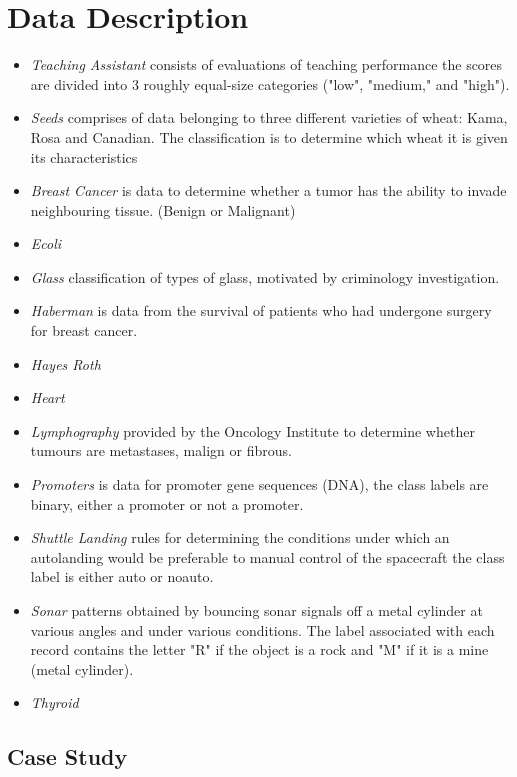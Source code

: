 \documentclass{cmppgr}
\begin{document}
 


\section{Data Description}
\begin{itemize}
	\item \textit{Teaching Assistant} consists of evaluations of teaching performance the scores are divided into 3 roughly equal-size categories ("low", "medium," and "high").
	\item \textit{Seeds} comprises of data belonging to three different varieties of wheat: Kama, Rosa and Canadian. The classification is to determine which wheat it is given its characteristics
	\item \textit{Breast Cancer} is data to determine whether a tumor has the ability to invade neighbouring tissue. (Benign or Malignant) 
	
    \item \textit{Ecoli} 
	\item \textit{Glass} classification of types of glass, motivated by criminology investigation.
	\item \textit{Haberman} is data from the survival of patients who had undergone surgery for breast cancer.
	\item \textit{Hayes Roth}
	\item \textit{Heart}
	\item \textit{Lymphography} provided by the Oncology Institute to determine whether tumours are metastases, malign or fibrous.
	\item \textit{Promoters} is data for promoter gene sequences (DNA), the class labels are binary, either a promoter or not a promoter.
	\item \textit{Shuttle Landing} rules for determining the conditions under which an autolanding would be preferable to manual control of the spacecraft the class label is either auto or noauto.
	\item \textit{Sonar} patterns obtained by bouncing sonar signals off a metal cylinder at various angles and under various conditions. The label associated with each record contains the letter "R" if the object is a rock and "M" if it is a mine (metal cylinder).
	\item \textit{Thyroid}
	
\end{itemize}

\subsection{Case Study}
\end{document}
